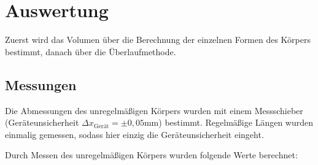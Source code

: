 \section{Auswertung}
\label{sec:Auswertung}

Zuerst wird das Volumen über die Berechnung der einzelnen Formen des Körpers bestimmt, danach über die Überlaufmethode.

\subsection{Messungen}

Die Abmessungen des unregelmäßigen Körpers wurden mit einem Messschieber (Geräteunsicherheit $\Delta x_{\text{Gerät}} = \pm0,05\unit{\mm}$) bestimmt. Regelmäßige Längen wurden einmalig gemessen, sodass hier einzig die Geräteunsicherheit eingeht.

Durch Messen des unregelmäßigen Körpers wurden folgende Werte berechnet:

